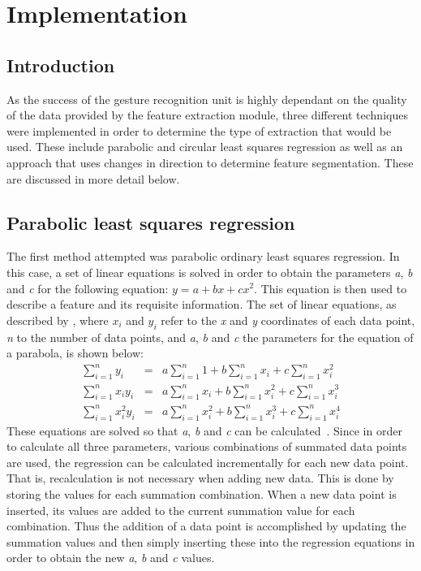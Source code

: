 \section{Implementation}

\subsection{Introduction}
As the success of the gesture recognition unit is highly dependant on the quality of the data provided by the feature extraction module, three different techniques were implemented in order to determine the type of extraction that would be used. These include parabolic and circular least squares regression as well as an approach that uses changes in direction to determine feature segmentation. These are discussed in more detail below.

\subsection{Parabolic least squares regression} 
The first method attempted was parabolic ordinary least squares regression. In this case, a set of linear equations is solved in order to obtain the parameters \emph{a}, \emph{b} and \emph{c} for the following equation: $y = a + bx + cx^2$. This equation is then used to describe a feature and its requisite information. The set of linear equations, as described by \citet{eFun10}, where $x_i$ and $y_i$ refer to the \emph{x} and \emph{y} coordinates of each data point, \emph{n} to the number of data points, and \emph{a}, \emph{b} and \emph{c} the parameters for the equation of a parabola, is shown below:
\begin{eqnarray*}
	\sum_{i=1}^n y_i & = & a \sum_{i=1}^n 1 + b \sum_{i=1}^n x_i + c \sum_{i=1}^n x_i^2 \\
	\sum_{i=1}^n x_i y_i & = & a \sum_{i=1}^n x_i + b \sum_{i=1}^n x_i^2 + c \sum_{i=1}^n x_i^3 \\
	\sum_{i=1}^n x_i^2 y_i & = & a \sum_{i=1}^n x_i^2 + b \sum_{i=1}^n x_i^3 + c \sum_{i=1}^n x_i^4
\end{eqnarray*}
These equations are solved so that \emph{a}, \emph{b} and \emph{c} can be calculated~\citep{eFun10}. Since in order to calculate all three parameters, various combinations of summated data points are used, the regression can be calculated incrementally for each new data point. That is, recalculation is not necessary when adding new data. This is done by storing the values for each summation combination. When a new data point is inserted, its values are added to the current summation value for each combination. Thus the addition of a data point is accomplished by updating the summation values and then simply inserting these into the regression equations in order to obtain the new \emph{a}, \emph{b} and \emph{c} values.

